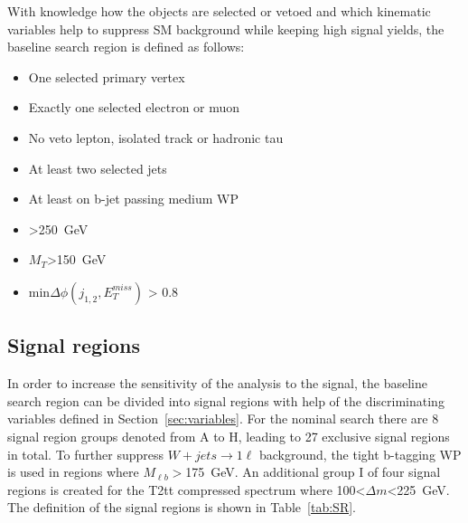 With knowledge how the objects are selected or vetoed and  which kinematic variables help to suppress SM background while keeping high signal yields, the baseline search region is defined as follows:

\begin{itemize}
\item One selected primary vertex
\item Exactly one selected electron or muon
\item No veto lepton, isolated track or hadronic tau
\item At least two selected jets
\item At least on b-jet passing medium WP 
\item \MET>250~GeV
\item $M_{T}$>150~GeV
\item min$\Delta \phi (j_{1,2}, E_{T}^{miss})$ > 0.8
\end{itemize}


\subsection{Signal regions~\label{sec:sr}}

In order to increase the sensitivity of the analysis to the signal, the baseline search region can be divided into signal regions with help of the discriminating variables defined in Section~\ref{sec:variables}. For the nominal search there are 8 signal region groups denoted from A to H, leading to 27 exclusive signal regions in total. To further suppress $W+jets \to 1\ell$ background, the tight b-tagging WP is used in regions where $M_{\ell b}>$175~GeV.  An additional group I of four signal regions is created for the T2tt compressed spectrum where 100<$\Delta m$<225~GeV. The definition of the signal regions is shown in Table~\ref{tab:SR}.


